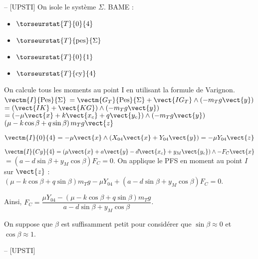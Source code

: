 \ifprof
\begin{corrige}-- [UPSTI]
On isole le système ${\Sigma}$.
BAME :
\begin{itemize}
\item $\torseurstat{T}{0}{4}$
\item $\torseurstat{T}{\text{pes}}{\Sigma}$
\item $\torseurstat{T}{0}{1}$
\item $\torseurstat{T}{\text{cy}}{4}$
\end{itemize}

On calcule tous les moments au point I en utilisant la formule de Varignon.
$\vectm{I}{\text{Pes}}{\Sigma} $
$= \vectm{G_T}{\text{Pes}}{\Sigma} + \vect{IG_T}\wedge \left(-m_T g\vect{y}\right)$
$=\left(\vect{IK}+\vect{KG}\right) \wedge \left(-m_T g\vect{y}\right)$
$ = \left(-\mu \vect{x} + k\vect{x_c}+q\vect{y_c}\right) \wedge \left(-m_T g\vect{y}\right)$
$\left(\mu -k\cos\beta+q\sin\beta \right) m_T g\vect{z}$

$\vectm{I}{0}{4} = -\mu \vect{x} \wedge \left(X_{04}\vect{x}+Y_{04}\vect{y}\right) =-\mu Y_{04}\vect{z}$

$\vectm{I}{Cy}{4} =\left(\mu \vect{x} + a\vect{y} - d\vect{x_c} +y_M \vect{y_c}\right) \wedge -F_C\vect{x}$
$=(a-d\sin\beta +y_M \cos\beta) F_C = 0$.
On applique le PFS en moment au point $I$ sur $\vect{z}$ : 
$\left(\mu -k\cos\beta+q\sin\beta \right) m_T g - \mu Y_{04}+\left(a-d\sin\beta +y_M \cos\beta\right) F_C = 0$.

Ainsi, $F_C=\dfrac{\mu Y_{04}-(\mu -k\cos\beta +q\sin\beta) m_T g}{a-d\sin\beta+y_M \cos\beta}$.

\end{corrige}
\else
\fi

On suppose que \(\beta\) est suffisamment petit pour considérer que \(\sin \beta \approx 0\) et \(\cos \beta \approx 1\).\\



\ifprof
\begin{corrige}-- [UPSTI]
\end{corrige}
\else
\fi

